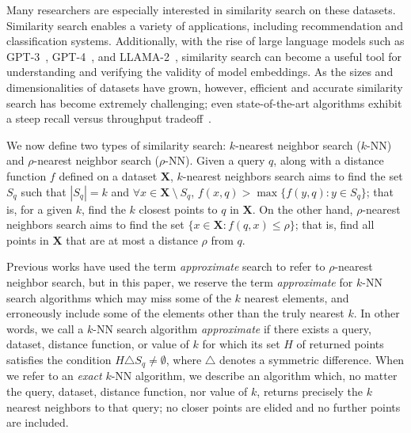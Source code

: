 Many researchers are especially interested in similarity search on these datasets. 
Similarity search enables a variety of applications, including recommendation and classification systems. 
Additionally, with the rise of large language models such as GPT-3~\cite{2020arXiv200514165B}, GPT-4~\cite{OpenAI2023GPT4TR}, and LLAMA-2~\cite{Touvron2023Llama2O}, similarity search can become a useful tool for understanding and verifying the validity of model embeddings. 
As the sizes and dimensionalities of datasets have grown, however, efficient and accurate similarity search has become extremely challenging; 
even state-of-the-art algorithms exhibit a steep recall versus throughput tradeoff~\cite{ishaq2019clustered}.

We now define two types of similarity search: $k$-nearest neighbor search ($k$-NN) and $\rho$-nearest neighbor search ($\rho$-NN). 
Given a query $q$, along with a distance function $f$ defined on a dataset $\textbf{X}$, $k$-nearest neighbors search aims to find 
the set $S_q$ such that  $|S_q| = k$ and $\forall x \in \textbf{X} \ \setminus \ S_q$, $f(x, q) > \max\{f(y, q): y \in S_q \}$;
that is, for a given $k$, find the $k$ closest points to $q$ in $ \textbf{X}$.
On the other hand, $\rho$-nearest neighbors search aims to find the set $\{x \in \textbf{X}: f(q, x) \leq \rho \}$;
that is, find all points in $\textbf{X}$ that are at most a distance $\rho$ from $q$.




Previous works have used the term \emph{approximate} search to refer to $\rho$-nearest neighbor search, but in this paper, 
we reserve the term \emph{approximate} for $k$-NN search algorithms which may miss some of the $k$ nearest elements, and erroneously include some of the elements other than the truly nearest $k$.
In other words, we call a $k$-NN search algorithm \emph{approximate} if there exists a query, dataset, distance function, or value of $k$ for which its set $H$ of returned points satisfies the condition $H \triangle S_q \neq \emptyset$, where $\triangle$ denotes a symmetric difference.
When we refer to an \emph{exact} $k$-NN algorithm, we describe an algorithm which, no matter the query, dataset, distance function, nor value of $k$, returns precisely the $k$ nearest neighbors to that query;
no closer points are elided and no further points are included.


